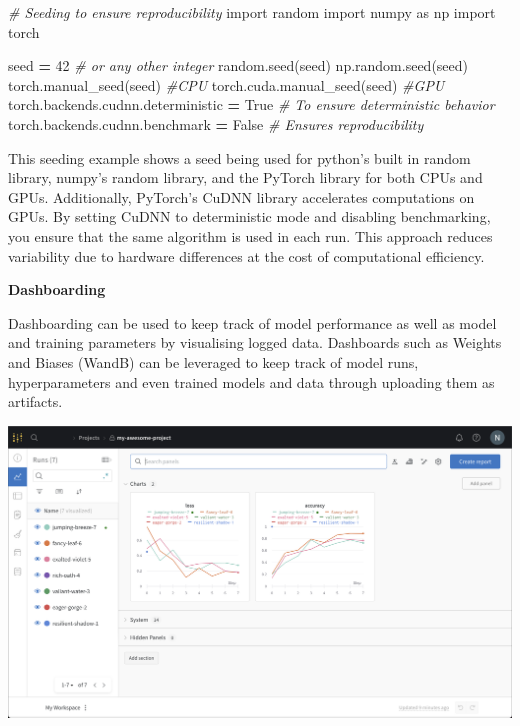 \documentclass[
]{book}
\newenvironment{Shaded}{\begin{snugshade}}{\end{snugshade}}
\newcommand{\CommentTok}[1]{\textcolor[rgb]{0.56,0.35,0.01}{\textit{#1}}}
\newcommand{\DecValTok}[1]{\textcolor[rgb]{0.00,0.00,0.81}{#1}}
\newcommand{\ImportTok}[1]{#1}
\newcommand{\NormalTok}[1]{#1}
\newcommand{\OperatorTok}[1]{\textcolor[rgb]{0.81,0.36,0.00}{\textbf{#1}}}
\newcommand{\VariableTok}[1]{\textcolor[rgb]{0.00,0.00,0.00}{#1}}
\begin{document}
\begin{Shaded}
\begin{Highlighting}[]
\CommentTok{\# Seeding to ensure reproducibility}
\ImportTok{import}\NormalTok{ random}
\ImportTok{import}\NormalTok{ numpy }\ImportTok{as}\NormalTok{ np}
\ImportTok{import}\NormalTok{ torch}

\NormalTok{seed }\OperatorTok{=} \DecValTok{42}  \CommentTok{\# or any other integer}
\NormalTok{random.seed(seed)}
\NormalTok{np.random.seed(seed)}
\NormalTok{torch.manual\_seed(seed) }\CommentTok{\#CPU}
\NormalTok{torch.cuda.manual\_seed(seed) }\CommentTok{\#GPU}
\NormalTok{torch.backends.cudnn.deterministic }\OperatorTok{=} \VariableTok{True}  \CommentTok{\# To ensure deterministic behavior}
\NormalTok{torch.backends.cudnn.benchmark }\OperatorTok{=} \VariableTok{False}     \CommentTok{\# Ensures reproducibility}
\end{Highlighting}
\end{Shaded}

This seeding example shows a seed being used for python's built in random library, numpy's random library, and the PyTorch library for both CPUs and GPUs. Additionally, PyTorch's CuDNN library accelerates computations on GPUs. By setting CuDNN to deterministic mode and disabling benchmarking, you ensure that the same algorithm is used in each run. This approach reduces variability due to hardware differences at the cost of computational efficiency.

\textbf{Dashboarding}

Dashboarding can be used to keep track of model performance as well as model and training parameters by visualising logged data. Dashboards such as Weights and Biases (WandB) can be leveraged to keep track of model runs, hyperparameters and even trained models and data through uploading them as artifacts.

\includegraphics{images/wandb.png}
\end{document}
